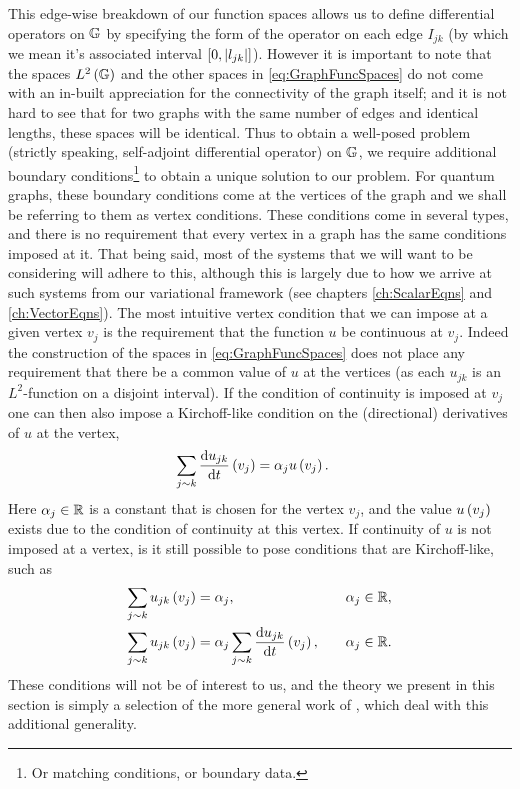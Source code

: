 This edge-wise breakdown of our function spaces allows us to define differential operators on $\mathbb{G}$ by specifying the form of the operator on each edge $I_{jk}$ (by which we mean it's associated interval $\left[ 0,\left\lvert l_{jk} \right\rvert \right]$).
However it is important to note that the spaces $L^2\left( \mathbb{G} \right)$ and the other spaces in \eqref{eq:GraphFuncSpaces} do not come with an in-built appreciation for the connectivity of the graph itself; and it is not hard to see that for two graphs with the same number of edges and identical lengths, these spaces will be identical.
Thus to obtain a well-posed problem (strictly speaking, self-adjoint differential operator) on $\mathbb{G}$, we require additional boundary conditions\footnote{Or matching conditions, or boundary data.} to obtain a unique solution to our problem.
For quantum graphs, these boundary conditions come at the vertices of the graph and we shall be referring to them as vertex conditions.
These conditions come in several types, and there is no requirement that every vertex in a graph has the same conditions imposed at it.
That being said, most of the systems that we will want to be considering will adhere to this, although this is largely due to how we arrive at such systems from our variational framework (see chapters \ref{ch:ScalarEqns} and \ref{ch:VectorEqns}).
The most intuitive vertex condition that we can impose at a given vertex $v_j$ is the requirement that the function $u$ be continuous at $v_j$.
Indeed the construction of the spaces in \eqref{eq:GraphFuncSpaces} does not place any requirement that there be a common value of $u$ at the vertices (as each $u_{jk}$ is an $L^2$-function on a disjoint interval).
If the condition of continuity is imposed at $v_j$ one can then also impose a Kirchoff-like condition on the (directional) derivatives of $u$ at the vertex,
\begin{align*}
	\sum_{j\sim k}\dfrac{\mathrm{d}u_{jk}}{\mathrm{d}t}\left( v_j \right) &= \alpha_j u\left( v_j \right).
\end{align*}
Here $\alpha_j\in\mathbb{R}$ is a constant that is chosen for the vertex $v_j$, and the value $u\left( v_j \right)$ exists due to the condition of continuity at this vertex.
If continuity of $u$ is not imposed at a vertex, is it still possible to pose conditions that are Kirchoff-like, such as
\begin{align*}
	\sum_{j\sim k}u_{jk}\left( v_j \right) &= \alpha_j, &\quad \alpha_j\in\mathbb{R}, \\
	\sum_{j\sim k}u_{jk}\left( v_j \right) &= \alpha_j \sum_{j\sim k}\dfrac{\mathrm{d}u_{jk}}{\mathrm{d}t}\left( v_j \right), &\quad \alpha_j\in\mathbb{R}.
\end{align*}
These conditions will not be of interest to us, and the theory we present in this section is simply a selection of the more general work of \cite{ershova2014isospectrality}, \cite{ershova2016isospectrality} which deal with this additional generality. \newline

